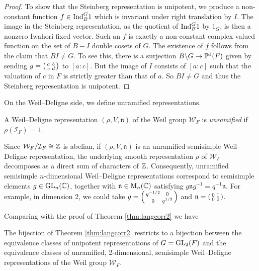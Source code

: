 \begin{proof}
    To show that the Steinberg representation is unipotent, we produce a non-constant function $f \in \mathrm{Ind}_B^G 1$ which is invariant under right translation by $I$. The image in the Steinberg representation, as the quotient of $\mathrm{Ind}_B^G 1$ by $1_G$, is then a nonzero Iwahori fixed vector. Such an $f$ is exactly a non-constant complex valued function on the set of $B-I$ double cosets of $G$. The existence of $f$ follows from the claim that $BI \neq G$. To see this, there is a surjection $B \backslash G \to \mathbb{P}^1(F)$ given by sending $g=\begin{psmallmatrix}
        a&b\\c&d
    \end{psmallmatrix}$ to $[a:c]$. But the image of $I$ consists of $[a:c]$ such that the valuation of $c$ in $F$ is strictly greater than that of $a$. So $BI \neq G$ and thus the Steinberg representation is unipotent. 
\end{proof}

On the Weil--Deligne side, we define unramified representations.

\begin{defn}
    A Weil--Deligne representation $(\rho, V, \mathfrak n)$ of the Weil group $\mathcal W_F$ is \textit{unramified} if $\rho(\mathcal I_F)=1$.
\end{defn}
\begin{rem}
    Since $\mathcal W_F/\mathcal I_F \cong \mathbb{Z}$ is abelian, if $(\rho,V,\mathfrak n)$ is an unramified semisimple Weil--Deligne representation, the underlying smooth representation $\rho$ of $\mathcal W_F$ decomposes as a direct sum of characters of $\mathbb{Z}$. Consequently, unramified semisimple $n$-dimensional Weil--Deligne representations correspond to semisimple elements $g \in \mathrm{GL}_n(\mathbb{C})$, together with $\mathfrak n \in \mathrm{M}_n(\mathbb{C})$ satisfying $g \mathfrak n g^{-1} = q^{-1}\mathfrak n$. For example, in dimension 2, we could take $g=\begin{psmallmatrix}
        q^{-1/2} &0\\0&q^{1/2}
    \end{psmallmatrix} $ and $\mathfrak n = \begin{psmallmatrix}
        0&1\\0&0
    \end{psmallmatrix}$.
\end{rem}

Comparing with the proof of Theorem \ref{thm:langcorr2} we have

\begin{cor}
    The bijection of Theorem \ref{thm:langcorr2} restricts to a bijection between the equivalence classes of unipotent representations of $G=\mathrm{GL}_2(F)$ and the equivalence classes of unramified, 2-dimensional, semisimple Weil--Deligne representations of the Weil group $\mathcal W_F$.    
\end{cor}


